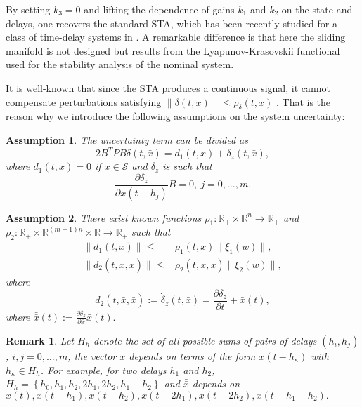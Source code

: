 \documentclass[onecolumn]{IEEEtran}
\newtheorem{obs}{Remark}
\newtheorem{assum}{Assumption}
\begin{document}
By setting $k_3=0$ and lifting the dependence of gains $k_1$ and $k_2$ on the state and delays, one recovers the standard STA, which has been recently studied for a class of time-delay systems in \cite{WaaaahJeronimo2019,Caballero2018}. {A remarkable} difference is that here the sliding manifold is not designed but results from the Lyapunov-Krasovskii functional used for the stability analysis of the nominal system. 

It is well-known that since the STA produces a continuous signal, it  cannot compensate  perturbations  satisfying $\|\delta(t,\bar x)\|\leq \rho_{\delta}(t,\bar x)$ \cite{Levant1993}.  That is the reason why we  introduce the following assumptions on the system uncertainty:
\begin{assum}
	\label{ass:delta}
	The uncertainty term can be divided as 
	\begin{equation}
	2B^TPB\delta(t,\bar x)=d_1(t,x)+\delta_z(t,\bar x),
	\end{equation}
	where  $d_1(t,x)=0$ if $x\in \mathcal{S}$  and $\delta_z$ is such that $$\frac{\partial \delta_z}{\partial  x(t-h_j)}B=0,\:j=0,\ldots,m.$$
\end{assum}
\begin{assum}
	\label{ass:bounds}
	There exist  known functions $\rho_1:\mathbb{R}_+\times \mathbb{R}^n\rightarrow \mathbb{R}_+$ and  $\rho_2:\mathbb{R}_+\times \mathbb{R}^{(m+1)n}\times \mathbb{R}\rightarrow \mathbb{R}_+$ such that 
	\begin{equation*}
	\begin{split}
	\|d_1(t,x)\|\leq& \rho_1(t,x)\|\xi_1(w)\|,\\
	\|	d_2(t,\bar x,\bar {\bar{ x}})\|\leq& \rho_2(t,\bar x,\bar {\bar{ x}})\|\xi_2(w)\|,
	\end{split}
	\end{equation*}
	where 
	\begin{equation*}
	d_2(t,\bar x,\bar {\bar{ x}}):=\dot \delta_z(t,\bar x)=\frac{\partial \delta_z}{\partial t}+\bar {\bar x}(t),
	\end{equation*}
	where $\bar {\bar x}(t):=\frac{\partial \delta_z}{\partial \bar x}\dot {\bar {x}}(t).$
\end{assum}

\begin{obs}
	Let $H_h$ denote the set of all possible sums of pairs of  delays $(h_i,h_j)$,  $i,j=0,\ldots,m$,  the vector $\bar{\bar{x}}$ depends on terms of the form  $x(t-h_{\kappa})$ with $h_\kappa\in H_h$. For example, for two delays $h_1$ and $h_2$, $H_h=\left\lbrace h_0, h_1,h_2,2h_1,2h_2,h_1+h_2\right\rbrace$ and $\bar {\bar x}$  depends on 
		$x(t),x(t-h_1),x(t-h_2),x(t-2h_1),x(t-2h_2),x(t-h_1-h_2).$

\end{obs}	
\end{document}
